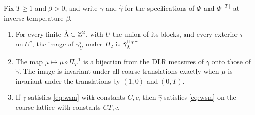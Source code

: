 \begin{lemma}\label{lem:blocking}
Fix \(T\ge1\) and \(\beta>0\), and write \(\gamma\) and \(\hat\gamma\) for the specifications of \(\Phi\) and \(\Phi^{[T]}\) at inverse temperature \(\beta\).
\begin{enumerate}[label=\textup{(\roman*)}]
\item For every finite \(\hat{\Lambda}\subset\mathbb Z^2\), with \(U\) the union of its blocks, and every exterior \(\tau\) on \(U^c\), the image of \(\gamma^\tau_U\) under \(\Pi_T\) is \(\hat\gamma^{\Pi_T\tau}_{\hat{\Lambda}}\).
\item The map \(\mu\mapsto\mu\circ\Pi_T^{-1}\) is a bijection from the DLR measures of \(\gamma\) onto those of \(\hat\gamma\). The image is invariant under all coarse translations exactly when \(\mu\) is invariant under the translations by \((1,0)\) and \((0,T)\).
\item If \(\gamma\) satisfies \eqref{eq:wsm} with constants \(C,c\), then \(\hat\gamma\) satisfies \eqref{eq:wsm} on the coarse lattice with constants \(CT,c\).
\end{enumerate}
\end{lemma}

